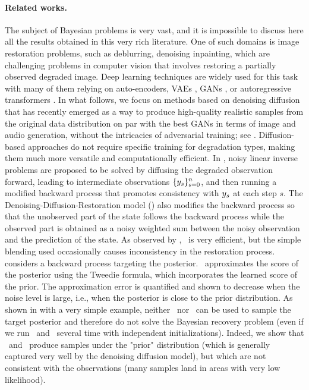 \paragraph{Related works. } 
The subject of Bayesian problems is very vast, and it is impossible to discuss here all the results obtained in this very rich literature.
One of such domains is image restoration problems, such as deblurring, denoising inpainting, which are challenging problems in computer vision that involves restoring a partially observed degraded image.
Deep learning techniques are widely used for this task \cite{arjomand2017deep,yeh2018image,xiang2023deep,wei2022deep}  with many of them relying on auto-encoders, VAEs \cite{ivanov2018variational,peng2021generating,zheng2019pluralistic}, GANs \cite{yeh2018image,zeng2022aggregated}, or autoregressive transformers \cite{yu2018generative,wan2021high}.
In what follows, we focus on methods based on denoising diffusion that has recently emerged as a way to produce high-quality realistic samples from the original data distribution on par with the best GANs in terms of image and audio generation, without the intricacies of adversarial training; see \cite{sohl2015deep,song2020score,song2022solving}.
Diffusion-based approaches do not require specific training for degradation types, making them much more versatile and computationally efficient. In \cite{song2022solving}, noisy linear inverse problems are proposed to be solved by diffusing the degraded observation forward, leading to intermediate observations $\{ y_s \}_{s = 0} ^n$, and then running a modified backward process that promotes consistency with $y_s$ at each step $s$.
The Denoising-Diffusion-Restoration model (\ddrm) \cite{kawar2022denoising} also modifies the backward process so that the unobserved part of the state follows the backward process while the observed part is obtained as a noisy weighted sum between the noisy observation and the prediction of the state. As observed by \cite{lugmayr2022repaint}, \ddrm\ is very efficient, but the simple blending used occasionally causes inconsistency in the restoration process.  
\dps\  \cite{chung2023diffusion} considers a backward process targeting the posterior. %
\dps\ approximates the score of the posterior using the Tweedie formula, which incorporates the learned score of the prior.
The approximation error is quantified and shown to decrease when the noise level is large, i.e., when the posterior is close to the prior distribution. As shown in  with a very simple example, neither \ddrm\ nor \dps\ can be used to sample the target posterior and therefore do not solve the Bayesian recovery problem (even if we run \ddrm\ and \dps\ several time with independent initializations). Indeed, we show that \ddrm\ and \dps\ produce samples under the "prior" distribution (which is generally captured very well by the denoising diffusion model), but which are not consistent with the observations (many samples land in areas with very low likelihood). 
